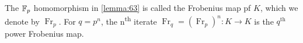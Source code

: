 \begin{definition}
  The $\mathbb{F}_{p}$ homomorphism in \autoref{lemma:63} is called the Frobenius map pf $K$, which we denote by $\operatorname{Fr}_p$. For $q = p^n$, the n\textsuperscript{th} iterate $\operatorname{Fr}_q = \left(\operatorname{Fr}_p\right)^n : K \rightarrow K$ is the $q^{\text{th}}$ power Frobenius map.
\end{definition}

